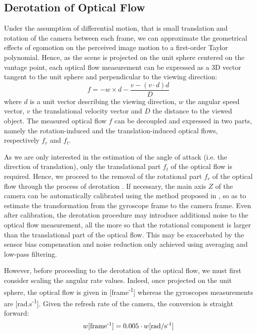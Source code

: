 \subsection{Derotation of Optical Flow}
Under the assumption of differential motion, that is small translation and rotation of the camera between each frame, we can approximate the geometrical effects of egomotion on the perceived image motion to a first-order Taylor polynomial. Hence, as the scene is projected on the unit sphere centered on the vantage point, each optical flow measurement can be expressed as a 3D vector tangent to the unit sphere and perpendicular to the viewing direction:
\begin{equation}
\label{equ:opticflow}
f = -w \times d - \dfrac{v - (v \cdot d)d}{D}
\end{equation}
where $d$ is a unit vector describing the viewing direction, $w$ the angular speed vector, $v$ the translational velocity vector and $D$ the distance to the viewed object. The measured optical flow $f$ can be decoupled and expressed in two parts, namely the rotation-induced and the translation-induced optical flows, respectively $f_r$ and $f_t$.

As we are only interested in the estimation of the angle of attack (i.e. the direction of translation), only the translational part $f_t$ of the optical flow is required. Hence, we proceed to the removal of the rotational part $f_r$ of the optical flow through the process of derotation \cite{derotation}. If necessary, the main axis $Z$ of the camera can be automatically calibrated using the method proposed in \cite{autocalib}, so as to estimate the transformation from the gyroscope frame to the camera frame. Even after calibration, the derotation procedure may introduce additional noise to the optical flow measurement, all the more so that the rotational component is larger than the translational part of the optical flow. This may be exacerbated by the sensor bias compensation and noise reduction only achieved using averaging and low-pass filtering.

However, before proceeding to the derotation of the optical flow, we must first consider scaling the angular rate values. Indeed, once projected on the unit sphere, the optical flow is given in [frame\textsuperscript{-1}] whereas the gyroscopes measurements are [rad.s\textsuperscript{-1}]. Given the refresh rate of the camera, the conversion is straight forward: 
\begin{equation}
w\mathrm{[frame\textsuperscript{-1}]} = 0.005 \cdot w\mathrm{[rad/s\textsuperscript{-1}]}
\end{equation}


